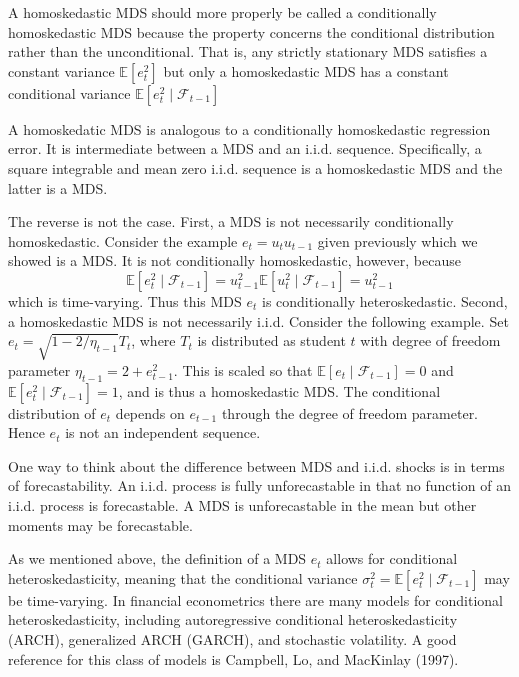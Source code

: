 \documentclass[10pt]{article}
\begin{document}
A homoskedastic MDS should more properly be called a conditionally homoskedastic MDS because the property concerns the conditional distribution rather than the unconditional. That is, any strictly stationary MDS satisfies a constant variance $\mathbb{E}\left[e_{t}^{2}\right]$ but only a homoskedastic MDS has a constant conditional variance $\mathbb{E}\left[e_{t}^{2} \mid \mathscr{F}_{t-1}\right]$

A homoskedatic MDS is analogous to a conditionally homoskedastic regression error. It is intermediate between a MDS and an i.i.d. sequence. Specifically, a square integrable and mean zero i.i.d. sequence is a homoskedastic MDS and the latter is a MDS.

The reverse is not the case. First, a MDS is not necessarily conditionally homoskedastic. Consider the example $e_{t}=u_{t} u_{t-1}$ given previously which we showed is a MDS. It is not conditionally homoskedastic, however, because
$$
\mathbb{E}\left[e_{t}^{2} \mid \mathscr{F}_{t-1}\right]=u_{t-1}^{2} \mathbb{E}\left[u_{t}^{2} \mid \mathscr{F}_{t-1}\right]=u_{t-1}^{2}
$$
which is time-varying. Thus this MDS $e_{t}$ is conditionally heteroskedastic. Second, a homoskedastic MDS is not necessarily i.i.d. Consider the following example. Set $e_{t}=\sqrt{1-2 / \eta_{t-1}} T_{t}$, where $T_{t}$ is distributed as student $t$ with degree of freedom parameter $\eta_{t-1}=2+e_{t-1}^{2}$. This is scaled so that $\mathbb{E}\left[e_{t} \mid \mathscr{F}_{t-1}\right]=0$ and $\mathbb{E}\left[e_{t}^{2} \mid \mathscr{F}_{t-1}\right]=1$, and is thus a homoskedastic MDS. The conditional distribution of $e_{t}$ depends on $e_{t-1}$ through the degree of freedom parameter. Hence $e_{t}$ is not an independent sequence.

One way to think about the difference between MDS and i.i.d. shocks is in terms of forecastability. An i.i.d. process is fully unforecastable in that no function of an i.i.d. process is forecastable. A MDS is unforecastable in the mean but other moments may be forecastable.

As we mentioned above, the definition of a MDS $e_{t}$ allows for conditional heteroskedasticity, meaning that the conditional variance $\sigma_{t}^{2}=\mathbb{E}\left[e_{t}^{2} \mid \mathscr{F}_{t-1}\right]$ may be time-varying. In financial econometrics there are many models for conditional heteroskedasticity, including autoregressive conditional heteroskedasticity (ARCH), generalized ARCH (GARCH), and stochastic volatility. A good reference for this class of models is Campbell, Lo, and MacKinlay (1997).
\end{document}

